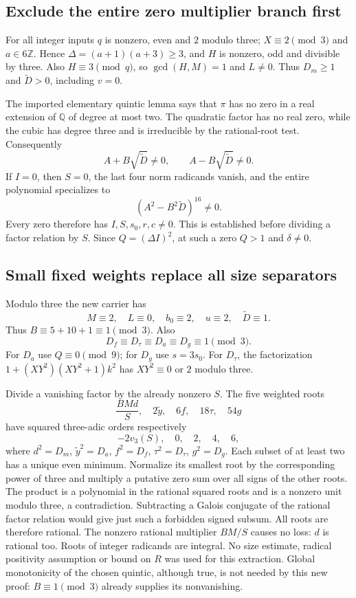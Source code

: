 \subsection{Exclude the entire zero multiplier branch first}
For all integer inputs $q$ is nonzero, even and $2$ modulo three;
$X\equiv2\pmod3$ and $a\in6\mathbb Z$. Hence
$\Delta=(a+1)(a+3)\ge3$, and $H$ is nonzero, odd and divisible by three.
Also $H\equiv3\pmod q$, so $\gcd(H,M)=1$ and $L\ne0$.
Thus $D_m\ge1$ and $\widetilde D>0$, including $v=0$.

The imported elementary quintic lemma says that $\pi$ has no zero in
a real extension of $\mathbb Q$ of degree at most two. The quadratic
factor has no real zero, while the cubic has degree three and is
irreducible by the rational-root test. Consequently
\[
 A+B\sqrt{\widetilde D}\ne0,
 \qquad A-B\sqrt{\widetilde D}\ne0.
\]
If $I=0$, then $S=0$, the last four norm radicands vanish, and the entire
polynomial specializes to
\[
 (A^2-B^2\widetilde D)^{16}\ne0.
\]
Every zero therefore has $I,S,s_0,r,c\ne0$. This is established before
dividing a factor relation by $S$. Since $Q=(\Delta I)^2$, at such a
zero $Q>1$ and $\delta\ne0$.

\subsection{Small fixed weights replace all size separators}
Modulo three the new carrier has
\[
 M\equiv2,\quad L\equiv0,\quad b_0\equiv2,
 \quad u\equiv2,\quad\widetilde D\equiv1.
\]
Thus $B\equiv5+10+1\equiv1\pmod3$. Also
\[
 D_f\equiv D_\tau\equiv D_a\equiv D_g\equiv1\pmod3.
\]
For $D_a$ use $Q\equiv0\pmod9$; for $D_g$ use $s=3s_0$.
For $D_\tau$, the factorization
$1+(XY^2)(XY^2+1)k^2$ has $XY^2\equiv0$ or $2$ modulo three.

Divide a vanishing factor by the already nonzero $S$.
The five weighted roots
\[
 \frac{BMd}{S},\quad 2\widetilde y,\quad6f,
 \quad18\tau,\quad54g
\]
have squared three-adic orders respectively
\[
 -2v_3(S),\quad0,\quad2,\quad4,\quad6,
\]
where $d^2=D_m$, $\widetilde y^2=D_a$, $f^2=D_f$,
$\tau^2=D_\tau$, $g^2=D_g$.
Each subset of at least two has a unique even minimum. Normalize its
smallest root by the corresponding power of three and multiply a putative
zero sum over all signs of the other roots. The product is a polynomial
in the rational squared roots and is a nonzero unit modulo three, a
contradiction. Subtracting a Galois conjugate of the rational factor
relation would give just such a forbidden signed subsum. All roots are
therefore rational. The nonzero rational multiplier $BM/S$ causes no
loss: $d$ is rational too. Roots of integer radicands are integral.
No size estimate, radical positivity assumption or bound on $R$ was
used for this extraction. Global monotonicity of the chosen quintic,
although true, is not needed by this new proof: $B\equiv1\pmod3$
already supplies its nonvanishing.


